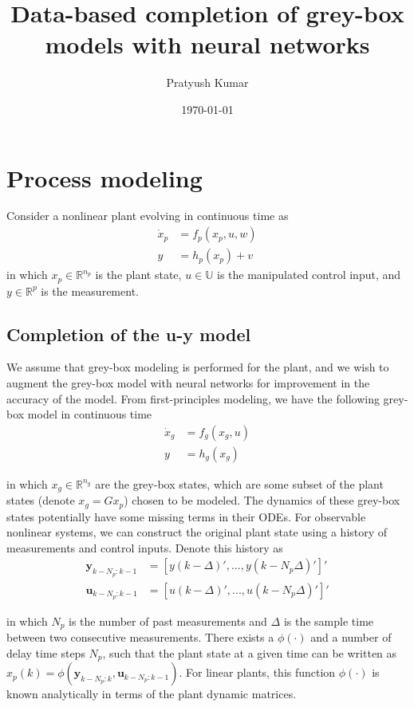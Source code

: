 \documentclass{article}
\title{Data-based completion of grey-box models with neural networks}
\author{Pratyush Kumar}
\date{\today}
\newcommand{\bbR}{\mathbb{R}}
\newcommand{\bbU}{\mathbb{U}}
\begin{document}
\maketitle

\section{Process modeling}
Consider a nonlinear plant evolving in continuous time as
\begin{align*}
  \dot x_p &= f_p(x_p, u, w) \\
  y &= h_p(x_p) + v
\end{align*}
in which $x_p \in \bbR^{n_p}$ is the plant state, 
$u \in \bbU$ is the manipulated control input,
and $y \in \bbR^p$ is the measurement. 

\subsection{Completion of the u-y model}
We assume that grey-box modeling is performed 
for the plant, and we wish to augment the grey-box model with neural networks
for improvement in the accuracy of the model. From first-principles modeling, 
we have the following grey-box model in continuous time
\begin{align*}
  \dot{x}_g &= f_g(x_g, u) \\
  y &= h_g(x_g)
\end{align*}

in which $x_g \in \bbR^{n_g}$ are the grey-box states, 
which are some subset 
of the plant states (denote $x_g = Gx_p$) chosen to 
be modeled. The dynamics of these grey-box states 
potentially have some missing terms 
in their ODEs.
For observable nonlinear systems, 
we can construct the original plant state
using a history of measurements and control inputs.
Denote this history as 
\begin{align*}
  \mathbf{y}_{k-N_p:k-1} &= [y(k-\Delta)', ..., y(k-N_p\Delta)']' \\
  \mathbf{u}_{k-N_p:k-1} &= [u(k-\Delta)', 
                               ..., u(k-N_p\Delta)']'
\end{align*}

in which $N_p$ is the number of 
past measurements and
$\Delta$ is the sample time between two consecutive
measurements. There exists a $\phi(\cdot)$ 
and a number of delay 
time steps $N_p$, such that the plant state
at a given time can be written as
$x_p(k) = \phi(\mathbf{y}_{k-N_p:k}, \mathbf{u}_{k-N_p:k-1})$.
For linear plants, this function $\phi(\cdot)$
is known analytically in terms of the plant dynamic
matrices.
\end{document}
